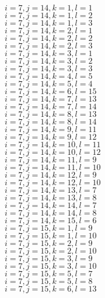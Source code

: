 \documentclass[14pt]{article}
\begin{document}
    $i=7,j=14,k=1,l=1 $ \\ 
    $i=7,j=14,k=1,l=2 $ \\ 
    $i=7,j=14,k=1,l=3 $ \\ 
    $i=7,j=14,k=2,l=1 $ \\ 
    $i=7,j=14,k=2,l=2 $ \\ 
    $i=7,j=14,k=2,l=3 $ \\ 
    $i=7,j=14,k=3,l=1 $ \\ 
    $i=7,j=14,k=3,l=2 $ \\ 
    $i=7,j=14,k=3,l=3 $ \\ 
    $i=7,j=14,k=4,l=5 $ \\ 
    $i=7,j=14,k=5,l=4 $ \\ 
    $i=7,j=14,k=6,l=15 $ \\ 
    $i=7,j=14,k=7,l=13 $ \\ 
    $i=7,j=14,k=7,l=14 $ \\ 
    $i=7,j=14,k=8,l=13 $ \\ 
    $i=7,j=14,k=8,l=14 $ \\ 
    $i=7,j=14,k=9,l=11 $ \\ 
    $i=7,j=14,k=9,l=12 $ \\ 
    $i=7,j=14,k=10,l=11 $ \\ 
    $i=7,j=14,k=10,l=12 $ \\ 
    $i=7,j=14,k=11,l=9 $ \\ 
    $i=7,j=14,k=11,l=10 $ \\ 
    $i=7,j=14,k=12,l=9 $ \\ 
    $i=7,j=14,k=12,l=10 $ \\ 
    $i=7,j=14,k=13,l=7 $ \\ 
    $i=7,j=14,k=13,l=8 $ \\ 
    $i=7,j=14,k=14,l=7 $ \\ 
    $i=7,j=14,k=14,l=8 $ \\ 
    $i=7,j=14,k=15,l=6 $ \\ 
    $i=7,j=15,k=1,l=9 $ \\ 
    $i=7,j=15,k=1,l=10 $ \\ 
    $i=7,j=15,k=2,l=9 $ \\ 
    $i=7,j=15,k=2,l=10 $ \\ 
    $i=7,j=15,k=3,l=9 $ \\ 
    $i=7,j=15,k=3,l=10 $ \\ 
    $i=7,j=15,k=5,l=7 $ \\ 
    $i=7,j=15,k=5,l=8 $ \\ 
    $i=7,j=15,k=6,l=13 $ \\ 
\end{document}
